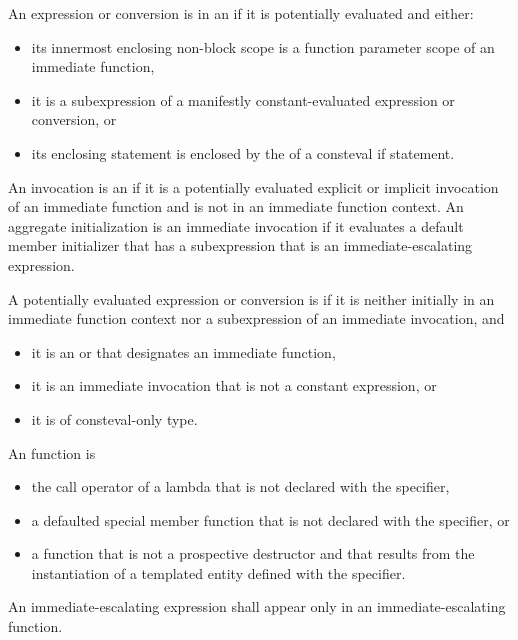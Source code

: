 \pnum
An expression or conversion is in an 
if it is potentially evaluated and either:
\begin{itemize}
\item
its innermost enclosing non-block scope is
a function parameter scope of an immediate function,
\item
it is a subexpression of a manifestly constant-evaluated expression
or conversion, or
\item
its enclosing statement is enclosed by
the  of a consteval if statement.
\end{itemize}
An invocation is an 
if it is a potentially evaluated explicit or implicit invocation of
an immediate function and
is not in an immediate function context.
An aggregate initialization is an immediate invocation
if it evaluates a default member initializer
that has a subexpression that is an immediate-escalating expression.

\pnum
{}%
%
%
%
A potentially evaluated expression or conversion is 
if it is neither initially in an immediate function context
nor a subexpression of an immediate invocation, and
\begin{itemize}
\item
it is an  or 
that designates an immediate function,
\item
it is an immediate invocation that is not a constant expression, or
\item
it is of consteval-only type.
\end{itemize}

\pnum
{}%
An  function is
\begin{itemize}
\item
the call operator of a lambda that is not declared
with the  specifier,
\item
a defaulted special member function
that is not declared with the  specifier, or
\item
a function that is not a prospective destructor and
that results from the instantiation
of a templated entity defined with the  specifier.
\end{itemize}
An immediate-escalating expression shall appear only
in an immediate-escalating function.

